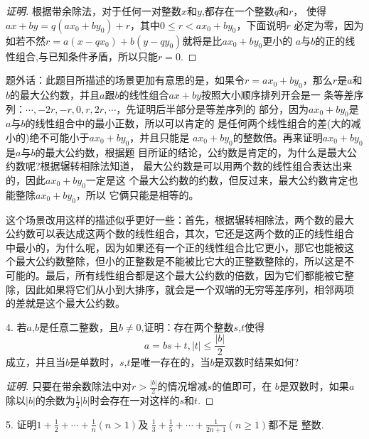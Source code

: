 \begin{proof}[证明]
根据带余除法，对于任何一对整数$x$和$y$,都存在一个整数$q$和$r$，
使得$ax+by=q(ax_0+by_0)+r$，其中$0\leqslant r<ax_0+by_0$，下面说明$r$
必定为零，因为如若不然$r=a(x-qx_0)+b(y-qy_0)$就将是比$ax_0+by_0$更小的
$a$与$b$的正的线性组合,与已知条件矛盾，所以只能$r=0$.
\end{proof}

题外话：此题目所描述的场景更加有意思的是，如果令$r=ax_0+by_0$，那么$r$是$a$和
$b$的最大公约数，并且$a$跟$b$的线性组合$ax+by$按照大小顺序排列开会是一
条等差序列：$\cdots,-2r,-r,0,r,2r,\cdots$，先证明后半部分是等差序列的
部分，因为$ax_0+by_0$是$a$与$b$的线性组合中的最小正数，所以可以肯定的
是任何两个线性组合的差(大的减小的)绝不可能小于$ax_0+by_0$，并且只能是
$ax_0+by_0$的整数倍。再来证明$ax_0+by_0$是$a$与$b$的最大公约数，根据题
目所证的结论，公约数是肯定的，为什么是最大公约数呢?根据辗转相除法知道，
最大公约数是可以用两个数的线性组合表达出来的，因此$ax_0+by_0$一定是这
个最大公约数的约数，但反过来，最大公约数肯定也能整除$ax_0+by_0$，所以
它俩只能是相等的。

这个场景改用这样的描述似乎更好一些：首先，根据辗转相除法，两个数的最大
公约数可以表达成这两个数的线性组合，其次，它还是这两个数的正的线性组合
中最小的，为什么呢，因为如果还有一个正的线性组合比它更小，那它也能被这
个最大公约数整除，但小的正整数是不能被比它大的正整数整除的，所以这是不
可能的。最后，所有线性组合都是这个最大公约数的倍数，因为它们都能被它整
除，因此如果将它们从小到大排序，就会是一个双端的无穷等差序列，相邻两项
的差就是这个最大公约数。

4. 若$a$,$b$是任意二整数，且$b\neq 0$,证明：存在两个整数$s$,$t$使得
\begin{displaymath}
  a=bs+t,|t|\leqslant \frac{|b|}{2}
\end{displaymath}
成立，并且当$b$是单数时，$s$,$t$是唯一存在的，当$b$是双数时结果如何?

\begin{proof}[证明]
只要在带余数除法中对$r>\frac{|b|}{2}$的情况增减$s$的值即可，在
$b$是双数时，如果$a$除以$|b|$的余数为$\frac{1}{2}|b|$时会存在一对这样的$s$和$t$.
\end{proof}

5. 证明$1+\frac{1}{2}+\cdots + \frac{1}{n}(n>1)$及
$\frac{1}{3}+\frac{1}{5}+\cdots + \frac{1}{2n+1}(n\geqslant 1)$都不是
整数.

